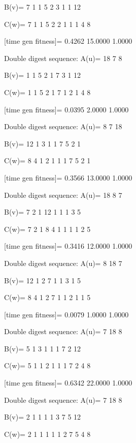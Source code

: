 B(v)=
     7     1     1     5     2     3     1     1    12

C(w)=
     7     1     1     5     2     2     1     1     1     4     8

[time gen fitness]=
    0.4262   15.0000    1.0000

Double digest sequence:
A(u)=
    18     7     8

B(v)=
     1     1     5     2     1     7     3     1    12

C(w)=
     1     1     5     2     1     7     1     2     1     4     8

[time gen fitness]=
    0.0395    2.0000    1.0000

Double digest sequence:
A(u)=
     8     7    18

B(v)=
    12     1     3     1     1     7     5     2     1

C(w)=
     8     4     1     2     1     1     1     7     5     2     1

[time gen fitness]=
    0.3566   13.0000    1.0000

Double digest sequence:
A(u)=
    18     8     7

B(v)=
     7     2     1    12     1     1     1     3     5

C(w)=
     7     2     1     8     4     1     1     1     1     2     5

[time gen fitness]=
    0.3416   12.0000    1.0000

Double digest sequence:
A(u)=
     8    18     7

B(v)=
    12     1     2     7     1     1     3     1     5

C(w)=
     8     4     1     2     7     1     1     2     1     1     5

[time gen fitness]=
    0.0079    1.0000    1.0000

Double digest sequence:
A(u)=
     7    18     8

B(v)=
     5     1     3     1     1     1     7     2    12

C(w)=
     5     1     1     2     1     1     1     7     2     4     8

[time gen fitness]=
    0.6342   22.0000    1.0000

Double digest sequence:
A(u)=
     7    18     8

B(v)=
     2     1     1     1     1     3     7     5    12

C(w)=
     2     1     1     1     1     1     2     7     5     4     8

